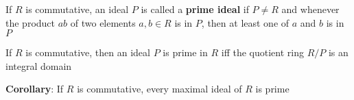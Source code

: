\documentclass[titlepage, 12pt]{article}
\begin{document}
\begin{definition}{}{}
    If $R$ is commutative, an ideal $P$ is called a \textbf{prime ideal} if
    $P\neq R$ and whenever the product $ab$ of two elements $a, b\in R$ is in
    $P$, then at least one of $a$ and $b$ is in $P$
\end{definition}

\begin{proposition}{}{}
    If $R$ is commutative, then an ideal $P$ is prime in $R$ iff the quotient
    ring $R/P$ is an integral domain
\end{proposition}

\textbf{Corollary}: If $R$ is commutative, every maximal ideal of $R$ is prime
\end{document}

